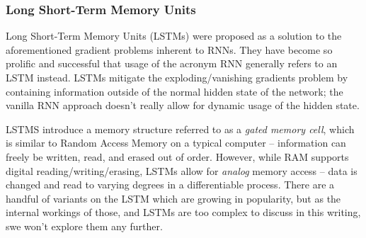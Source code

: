 \documentclass{report}
\begin{document}
	\subsubsection{Long Short-Term Memory Units}
	Long Short-Term Memory Units (LSTMs) were proposed as a solution to the aforementioned gradient problems inherent to RNNs. They have become so prolific and successful that usage of the acronym RNN generally refers to an LSTM instead. LSTMs mitigate the exploding/vanishing gradients problem by containing information outside of the normal hidden state of the network; the vanilla RNN approach doesn't really allow for dynamic usage of the hidden state. \par
	LSTMS introduce a memory structure referred to as a \textit{gated memory cell}, which is similar to Random Access Memory on a typical computer -- information can freely be written, read, and erased out of order. However, while RAM supports digital reading/writing/erasing, LSTMs allow for \emph{analog} memory access -- data is changed and read to varying degrees in a differentiable process. There are a handful of variants on the LSTM which are growing in popularity, but as the internal workings of those, and LSTMs are too complex to discuss in this writing, swe won't explore them any further. \par
	
\end{document}
